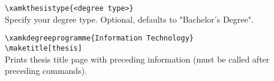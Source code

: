 \verb|\xamkthesistype{<degree type>}|\\
Specify your degree type.
Optional, defaults to "Bachelor's Degree".

\verb|\xamkdegreeprogramme{Information Technology}|\\

\verb|\maketitle[thesis]|\\
Prints thesis title page with preceding information (must be called after preceding commands).

\begin{comment}

\clearpage
\subsection{subsection 1}

\section{Test appendix 2}

\section{Test appendix 3}
\clearpage
\subsection{subsection 1}
\clearpage
\subsection{subsection 2}
\clearpage

\end{comment}
